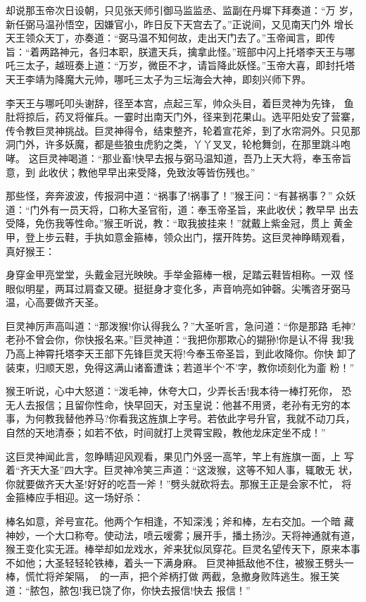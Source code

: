 却说那玉帝次日设朝，只见张天师引御马监监丞、监副在丹墀下拜奏道：“万
岁，新任弼马温孙悟空，因嫌官小，昨日反下天宫去了。”正说间，又见南天门外
增长天王领众天丁，亦奏道：“弼马温不知何故，走出天门去了。”玉帝闻言，即传
旨：“着两路神元，各归本职，朕遣天兵，擒拿此怪。”班部中闪上托塔李天王与哪
吒三太子，越班奏上道：“万岁，微臣不才，请旨降此妖怪。”玉帝大喜，即封托塔
天王李靖为降魔大元帅，哪吒三太子为三坛海会大神，即刻兴师下界。

李天王与哪吒叩头谢辞，径至本宫，点起三军，帅众头目，着巨灵神为先锋，
鱼肚将掠后，药叉将催兵。一霎时出南天门外，径来到花果山。选平阳处安了营寨，
传令教巨灵神挑战。巨灵神得令，结束整齐，轮着宣花斧，到了水帘洞外。只见那
洞门外，许多妖魔，都是些狼虫虎豹之类，丫丫叉叉，轮枪舞剑，在那里跳斗咆哮。
这巨灵神喝道：“那业畜!快早去报与弼马温知道，吾乃上天大将，奉玉帝旨意，到
此收伏；教他早早出来受降，免致汝等皆伤残也。”

那些怪，奔奔波波，传报洞中道：“祸事了!祸事了！”猴王问：“有甚祸事？”
众妖道：“门外有一员天将，口称大圣官衔，道：奉玉帝圣旨，来此收伏；教早早
出去受降，免伤我等性命。”猴王听说，教：“取我披挂来！”就戴上紫金冠，贯上
黄金甲，登上步云鞋，手执如意金箍棒，领众出门，摆开阵势。这巨灵神睁睛观看，
真好猴王：

身穿金甲亮堂堂，头戴金冠光映映。手举金箍棒一根，足踏云鞋皆相称。一双
怪眼似明星，两耳过肩查又硬。挺挺身才变化多，声音响亮如钟磬。尖嘴咨牙弼马
温，心高要做齐天圣。

巨灵神厉声高叫道：“那泼猴!你认得我么？”大圣听言，急问道：“你是那路
毛神?老孙不曾会你，你快报名来。”巨灵神道：“我把你那欺心的猢狲!你是认不得
我!我乃高上神霄托塔李天王部下先锋巨灵天将!今奉玉帝圣旨，到此收降你。你快
卸了装束，归顺天恩，免得这满山诸畜遭诛；若道半个‘不’字，教你顷刻化为齑
粉！”

猴王听说，心中大怒道：“泼毛神，休夸大口，少弄长舌!我本待一棒打死你，
恐无人去报信；且留你性命，快早回天，对玉皇说：他甚不用贤，老孙有无穷的本
事，为何教我替他养马?你看我这旌旗上字号。若依此字号升官，我就不动刀兵，
自然的天地清泰；如若不依，时间就打上灵霄宝殿，教他龙床定坐不成！”

这巨灵神闻此言，忽睁睛迎风观看，果见门外竖一高竿，竿上有旌旗一面，上
写着“齐天大圣”四大字。巨灵神冷笑三声道：“这泼猴，这等不知人事，辄敢无
状，你就要做齐天大圣!好好的吃吾一斧！”劈头就砍将去。那猴王正是会家不忙，
将金箍棒应手相迎。这一场好杀：

棒名如意，斧号宣花。他两个乍相逢，不知深浅；斧和棒，左右交加。一个暗
藏神妙，一个大口称夸。使动法，喷云嗳雾；展开手，播土扬沙。天将神通就有道，
猴王变化实无涯。棒举却如龙戏水，斧来犹似凤穿花。巨灵名望传天下，原来本事
不如他；大圣轻轻轮铁棒，着头一下满身麻。
巨灵神抵敌他不住，被猴王劈头一棒，慌忙将斧架隔，的一声，把个斧柄打做
两截，急撤身败阵逃生。猴王笑道：“脓包，脓包!我已饶了你，你快去报信!快去
报信！”

